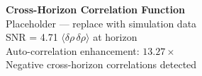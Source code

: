 \documentclass{article}
\begin{document}
\begin{center}
\Large\textbf{Cross-Horizon Correlation Function}\\[1em]
\normalsize Placeholder --- replace with simulation data\\[1em]
SNR = 4.71 \quad $\langle\delta\rho\,\delta\rho\rangle$ at horizon\\[0.5em]
Auto-correlation enhancement: $13.27\times$\\[0.5em]
Negative cross-horizon correlations detected
\end{center}
\end{document}
